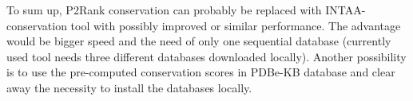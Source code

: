 To sum up, P2Rank conservation can probably be replaced with INTAA-conservation tool with possibly improved or similar performance. The advantage would be bigger speed and the need of only one sequential database (currently used tool needs three different databases downloaded locally). Another possibility is to use the pre-computed conservation scores in PDBe-KB database and clear away the necessity to install the databases locally.





